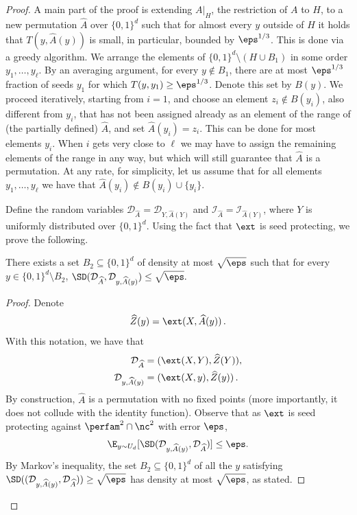 \begin{proof}
                A main part of the proof is extending $A|_H$, the restriction of $A$ to $H$, to a new permutation $\widehat{A}$ over $\{0,1\}^d$ such that for almost every $y$ outside of $H$ it holds that $T(y,\widehat{A}(y))$ is small, in particular, bounded by $\eps^{1/3}$. This is done via a greedy algorithm. We arrange the elements of $\{0,1\}^d \setminus (H \cup B_1)$ in some order $y_1,\ldots,y_\ell$. By an averaging argument, for every $y \not\in B_1$, there are at most $\eps^{1/3}$ fraction of seeds $y_1$ for which $T(y,y_1) \ge \eps^{1/3}$. Denote this set by $B(y)$. We proceed iteratively, starting from $i = 1$, and choose an element $z_i \not\in B(y_i)$, also different from $y_i$, that has not been assigned already as %
an element of the range %
of (the partially defined) $\widehat{A}$, 
and set $\widehat{A}(y_i) = z_i$. This can be done for most
%
elements $y_i$.  %
%
%
When $i$ gets very close to $\ell$ we may have to assign the remaining 
%
elements of the range %
in any way, but which will still
%
 guarantee that $\widehat{A}$ is a permutation. At any rate, for simplicity, let us assume that for all elements $y_1,\ldots,y_\ell$ we have that $\widehat{A}(y_i) \not\in B(y_i) \cup \{y_i\}$.
		

Define the random variables $\mathcal{D}_{\widehat{A}} = \mathcal{D}_{Y,\widehat{A}(Y)}$ and 
$\mathcal{I}_{\widehat{A}} = \mathcal{I}_{\widehat{A}(Y)}$,
	where $Y$ is uniformly distributed over $\{0,1\}^d$. Using the fact that $\ext$ is seed protecting, we prove the following.
	
	\begin{claim}\label{claim:d is concentrated i}
		There exists a set $B_2 \subseteq \{0,1\}^d$ of density at most $\sqrt{\eps}$ such that for every $y \in \{0,1\}^d \setminus B_2$,
		$
		\SD(\mathcal{D}_{\widehat{A}}, \mathcal{D}_{y,\widehat{A}(y)}) \le \sqrt{\eps}.
		$
	\end{claim}
	
	\begin{proof}
		Denote 
\[
		\widehat{Z}(y) =\ext(X,\widehat{A}(y))\,.
\]
		With this notation, we have that
		\begin{align*}
		\mathcal{D}_{\widehat{A}} &= ( \ext(X,Y), \widehat{Z}(Y) ),\\
		\mathcal{D}_{y,\widehat{A}(y)} &= ( \ext(X,y), \widehat{Z}(y) )\,.
		\end{align*}
			By construction, $\widehat{A}$ is a permutation with no fixed points (more importantly, it does not collude with the identity function). Observe that as $\ext$ is seed protecting against $\perfam^2 \cap \nc^2$ with error $\eps$, 
		\[
		\E_{y\sim U_d}[\SD(\mathcal{D}_{y,\widehat{A}(y)}, \mathcal{D}_{\widehat{A}})] \leq \eps.
		\]
By Markov's inequality, the set $B_2 \subseteq \{0,1\}^d$ of %
all the $y$  %
satisfying
$
		\SD((\mathcal{D}_{y,\widehat{A}(y)}, \mathcal{D}_{\widehat{A}})) \geq \sqrt{\eps}
		$
		has density at most $\sqrt{\eps}$, as stated.
		

\end{proof}
\end{proof}
